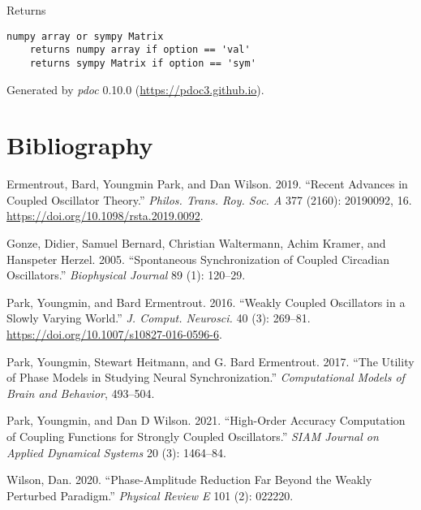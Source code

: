 \documentclass[english,a4paper,oneside]{article}
\begin{document}
Returns

\begin{verbatim}
numpy array or sympy Matrix
    returns numpy array if option == 'val'
    returns sympy Matrix if option == 'sym'
\end{verbatim}

Generated by \emph{pdoc} 0.10.0 (\url{https://pdoc3.github.io}).

\hypertarget{bibliography}{%
\section*{Bibliography}\label{bibliography}}

\hypertarget{refs}{}
\leavevmode\hypertarget{ref-ermentrout2019recent}{}%
Ermentrout, Bard, Youngmin Park, and Dan Wilson. 2019. ``Recent Advances
in Coupled Oscillator Theory.'' \emph{Philos. Trans. Roy. Soc. A} 377
(2160): 20190092, 16. \url{https://doi.org/10.1098/rsta.2019.0092}.

\leavevmode\hypertarget{ref-gonze2005spontaneous}{}%
Gonze, Didier, Samuel Bernard, Christian Waltermann, Achim Kramer, and
Hanspeter Herzel. 2005. ``Spontaneous Synchronization of Coupled
Circadian Oscillators.'' \emph{Biophysical Journal} 89 (1): 120--29.

\leavevmode\hypertarget{ref-park2016weakly}{}%
Park, Youngmin, and Bard Ermentrout. 2016. ``Weakly Coupled Oscillators
in a Slowly Varying World.'' \emph{J. Comput. Neurosci.} 40 (3):
269--81. \url{https://doi.org/10.1007/s10827-016-0596-6}.

\leavevmode\hypertarget{ref-park2017utility}{}%
Park, Youngmin, Stewart Heitmann, and G. Bard Ermentrout. 2017. ``The
Utility of Phase Models in Studying Neural Synchronization.''
\emph{Computational Models of Brain and Behavior}, 493--504.

\leavevmode\hypertarget{ref-park2021high}{}%
Park, Youngmin, and Dan D Wilson. 2021. ``High-Order Accuracy
Computation of Coupling Functions for Strongly Coupled Oscillators.''
\emph{SIAM Journal on Applied Dynamical Systems} 20 (3): 1464--84.

\leavevmode\hypertarget{ref-wilson2020phase}{}%
Wilson, Dan. 2020. ``Phase-Amplitude Reduction Far Beyond the Weakly
Perturbed Paradigm.'' \emph{Physical Review E} 101 (2): 022220.
\end{document}
